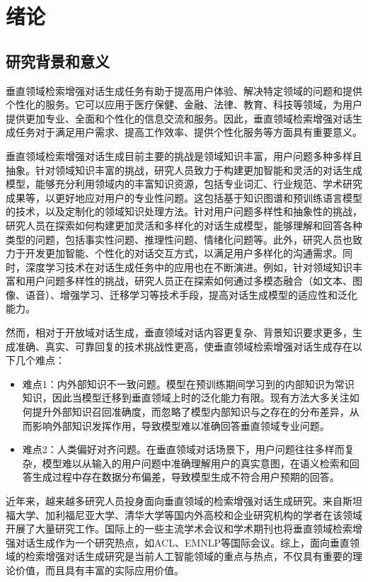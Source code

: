 \chapter{绪论}
%
\section{研究背景和意义}
%
垂直领域检索增强对话生成任务有助于提高用户体验、解决特定领域的问题和提供个性化的服务。它可以应用于医疗保健、金融、法律、教育、科技等领域，为用户提供更加专业、全面和个性化的信息交流和服务。因此，垂直领域检索增强对话生成任务对于满足用户需求、提高工作效率、提供个性化服务等方面具有重要意义。

垂直领域检索增强对话生成目前主要的挑战是领域知识丰富，用户问题多种多样且抽象。针对领域知识丰富的挑战，研究人员致力于构建更加智能和灵活的对话生成模型，能够充分利用领域内的丰富知识资源，包括专业词汇、行业规范、学术研究成果等，以更好地应对用户的专业性问题。这包括基于知识图谱和预训练语言模型的技术，以及定制化的领域知识处理方法。针对用户问题多样性和抽象性的挑战，研究人员在探索如何构建更加灵活和多样化的对话生成模型，能够理解和回答各种类型的问题，包括事实性问题、推理性问题、情绪化问题\cite{JSJX202312001}等。此外，研究人员也致力于开发更加智能、个性化的对话交互方式，以满足用户多样化的沟通需求。同时，深度学习技术在对话生成任务中的应用也在不断演进。例如，针对领域知识丰富和用户问题多样性的挑战，研究人员正在探索如何通过多模态融合（如文本、图像、语音）、增强学习、迁移学习等技术手段，提高对话生成模型的适应性和泛化能力。

然而，相对于开放域对话生成，垂直领域对话内容更复杂、背景知识要求更多，生成准确、真实、可靠回复的技术挑战性更高，使垂直领域检索增强对话生成存在以下几个难点：

\begin{itemize}[topsep = 0 pt, itemsep= 0 pt, parsep=0pt, partopsep=0pt, leftmargin=36pt, itemindent=0pt, labelsep=6pt, listparindent=24pt]
	\item 难点1：内外部知识不一致问题。模型在预训练期间学习到的内部知识为常识知识，因此当模型迁移到垂直领域上时的泛化能力有限。现有方法大多关注如何提升外部知识召回准确度，而忽略了模型内部知识与之存在的分布差异，从而影响外部知识发挥作用，导致模型难以准确回答垂直领域专业问题。
	\item 难点2：人类偏好对齐问题。在垂直领域对话场景下，用户问题往往多样而复杂，模型难以从输入的用户问题中准确理解用户的真实意图，在语义检索和回答生成过程中存在数据分布偏差，导致模型生成不符合用户预期的回答。
\end{itemize}

近年来，越来越多研究人员投身面向垂直领域的检索增强对话生成研究\cite{RJXB202402009,DBLP:journals/corr/abs-2305-03653,DBLP:journals/corr/abs-2310-11511}。来自斯坦福大学、加利福尼亚大学、清华大学等国内外高校和企业研究机构的学者在该领域开展了大量研究工作\cite{DBLP:conf/emnlp/WangYW23,DBLP:journals/corr/abs-2306-16092}。国际上的一些主流学术会议和学术期刊也将垂直领域检索增强对话生成作为一个研究热点，如ACL、EMNLP等国际会议\cite{DBLP:conf/acl/ZhouZHHZ20,DBLP:conf/emnlp/JungSL20}。综上，面向垂直领域的检索增强对话生成研究是当前人工智能领域的重点与热点，不仅具有重要的理论价值，而且具有丰富的实际应用价值。

